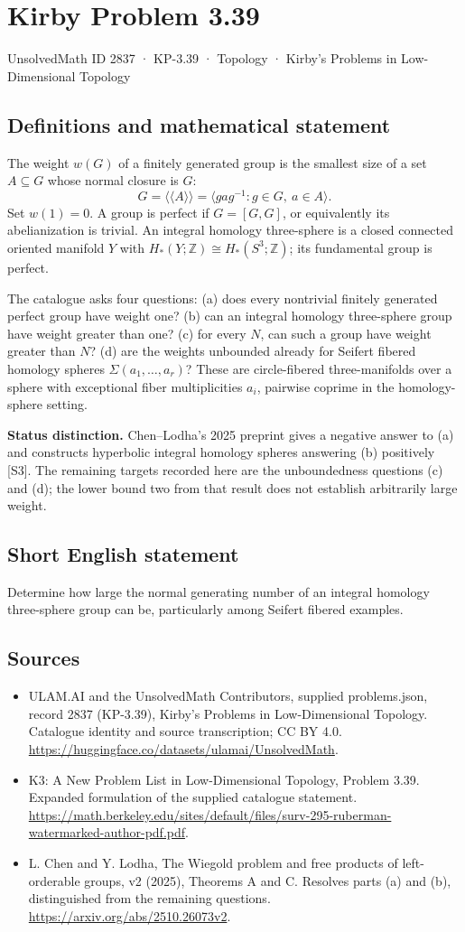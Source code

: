 \documentclass[11pt,a4paper]{article}
\begin{document}
\section*{Kirby Problem 3.39}\label{2837}
{\small UnsolvedMath ID 2837 · KP-3.39 · Topology · Kirby's Problems in Low-Dimensional Topology}
\subsection{Definitions and mathematical statement}
The weight $w(G)$ of a finitely generated group is the smallest size of a
set $A\subseteq G$ whose normal closure is $G$:
\[
 G=\langle\!\langle A\rangle\!\rangle
   =\langle gag^{-1}:g\in G,\ a\in A\rangle.
\]
Set $w(1)=0$. A group is perfect if $G=[G,G]$, or equivalently its
abelianization is trivial. An integral homology three-sphere is a closed
connected oriented manifold $Y$ with $H_*(Y;\mathbb Z)\cong H_*(S^3;\mathbb Z)$;
its fundamental group is perfect.

The catalogue asks four questions: (a) does every nontrivial finitely generated
perfect group have weight one? (b) can an integral homology three-sphere
group have weight greater than one? (c) for every $N$, can such a group have
weight greater than $N$? (d) are the weights unbounded already for Seifert
fibered homology spheres $\Sigma(a_1,\ldots,a_r)$? These are circle-fibered
three-manifolds over a sphere with exceptional fiber multiplicities $a_i$,
pairwise coprime in the homology-sphere setting.

\textbf{Status distinction.} Chen--Lodha's 2025 preprint gives a negative
answer to (a) and constructs hyperbolic integral homology spheres answering
(b) positively [S3]. The remaining targets recorded here are the unboundedness
questions (c) and (d); the lower bound two from that result does not establish
arbitrarily large weight.
\subsection{Short English statement}
Determine how large the normal generating number of an integral homology three-sphere group can be, particularly among Seifert fibered examples.
\subsection{Sources}
\begin{itemize}
\item[S1] ULAM.AI and the UnsolvedMath Contributors, supplied problems.json, record 2837 (KP-3.39), Kirby's Problems in Low-Dimensional Topology. Catalogue identity and source transcription; CC BY 4.0.
\url{https://huggingface.co/datasets/ulamai/UnsolvedMath}.
\item[S2] K3: A New Problem List in Low-Dimensional Topology, Problem 3.39. Expanded formulation of the supplied catalogue statement.
\url{https://math.berkeley.edu/sites/default/files/surv-295-ruberman-watermarked-author-pdf.pdf}.
\item[S3] L. Chen and Y. Lodha, The Wiegold problem and free products of left-orderable groups, v2 (2025), Theorems A and C. Resolves parts (a) and (b), distinguished from the remaining questions.
\url{https://arxiv.org/abs/2510.26073v2}.
\end{itemize}
\end{document}

